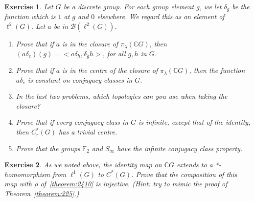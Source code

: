 \documentclass{book}
\newtheorem{exercise}{Exercise}[section]
\begin{document}
\begin{exercise}
  Let \(G\) be a discrete group. For each group element \(g\), we
  let \(\delta_g\) be the function which is \(1\) at \(g\) and \(0\) elsewhere. We regard this as an
  element of \(\ell^2(G)\). Let \(a\) be in \(\mathcal{B}(\ell^2(G))\).
  \begin{enumerate}
    \item Prove that if \(a\) is in the closure of \(\pi_\lambda(\mathbb{C}G)\), then \((a\delta_e)(g) =< a\delta_h,\delta_g h >\),
    for all \(g,h\) in \(G\).
    \item Prove that if \(a\) is in the centre of the closure of \(\pi_\lambda(\mathbb{C}G)\), then the
    function \(a\delta_e\) is constant on conjugacy classes in \(G\).
    \item In the last two problems, which topologies can you use when taking the
    closure?
    \item Prove that if every conjugacy class in \(G\) is infinite, except that of the
    identity, then \(C^*_r(G)\) has a trivial centre.
    \item Prove that the groups \(\mathbb{F}_2\) and \(S_\infty\) have the infinite conjugacy class property.
  \end{enumerate}
\end{exercise}
\begin{exercise}
  As we noted above, the identity map on \(\mathbb{C}G\) extends to a
  *-homomorphism from \(\ell^1(G)\) to \(C^*(G)\). Prove that the composition of this
  map with \(\rho\) of~\ref{theorem:2410} is injective. (Hint: try to mimic the proof of Theorem~\ref{theorem:225}.)
\end{exercise}
\end{document}
